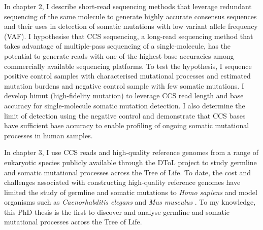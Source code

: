In chapter 2, I describe short-read sequencing methods that leverage redundant sequencing of the same molecule to generate highly accurate consensus sequences and their uses in detection of somatic mutations with low variant allele frequency (VAF). I hypothesise that CCS sequencing, a long-read sequencing method that takes advantage of multiple-pass sequencing of a single-molecule, has the potential to generate reads with one of the highest base accuracies among commercially available sequencing platforms. To test the hypothesis, I sequence positive control samples with characterised mutational processes and estimated mutation burdens and negative control sample with few somatic mutations. I develop himut (high-fidelity mutation) to leverage CCS read length and base accuracy for single-molecule somatic mutation detection. I also determine the limit of detection using the negative control and demonstrate that CCS bases have sufficient base accuracy to enable profiling of ongoing somatic mutational processes in human samples. 


In chapter 3, I use CCS reads and high-quality reference genomes from a range of eukaryotic species publicly available through the DToL project to study germline and somatic mutational processes across the Tree of Life. To date, the cost and challenges associated with constructing high-quality reference genomes have limited the study of germline and somatic mutations to \textit{Homo sapiens} and model organisms such as \textit{Caenorhabditis elegans} \cite{Meier2014-do} and \textit{Mus musculus} \cite{}. To my knowledge, this PhD thesis is the first to discover and analyse germline and somatic mutational processes across the Tree of Life.  

